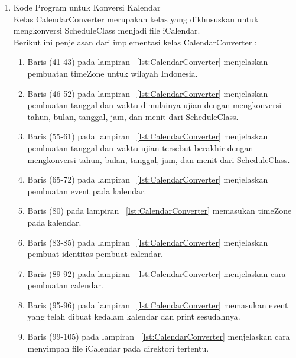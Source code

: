 \begin{enumerate}
\item Kode Program untuk Konversi Kalendar \\
Kelas CalendarConverter merupakan kelas yang dikhususkan untuk mengkonversi ScheduleClass menjadi file iCalendar. \\
Berikut ini penjelasan dari implementasi kelas CalendarConverter :
\begin{enumerate}
	\item Baris (41-43) pada lampiran ~\ref{lst:CalendarConverter} menjelaskan pembuatan timeZone untuk wilayah Indonesia.
	\item Baris (46-52) pada lampiran ~\ref{lst:CalendarConverter} menjelaskan pembuatan tanggal dan waktu dimulainya ujian dengan mengkonversi tahun, bulan, tanggal, jam, dan menit dari ScheduleClass.
	\item Baris (55-61) pada lampiran ~\ref{lst:CalendarConverter} menjelaskan pembuatan tanggal dan waktu ujian tersebut berakhir dengan mengkonversi tahun, bulan, tanggal, jam, dan menit dari ScheduleClass.
	\item Baris (65-72) pada lampiran ~\ref{lst:CalendarConverter} menjelaskan pembuatan event pada kalendar.
	\item Baris (80) pada lampiran ~\ref{lst:CalendarConverter} memasukan timeZone pada kalendar.
	\item Baris (83-85) pada lampiran ~\ref{lst:CalendarConverter} menjelaskan pembuat identitas pembuat calendar.
	\item Baris (89-92) pada lampiran ~\ref{lst:CalendarConverter} menjelaskan cara pembuatan calendar.
	\item Baris (95-96) pada lampiran ~\ref{lst:CalendarConverter} memasukan event yang telah dibuat kedalam kalendar dan print sesudahnya.
	\item Baris (99-105) pada lampiran ~\ref{lst:CalendarConverter} menjelaskan cara menyimpan file iCalendar pada direktori tertentu.
\end{enumerate}


\end{enumerate}
